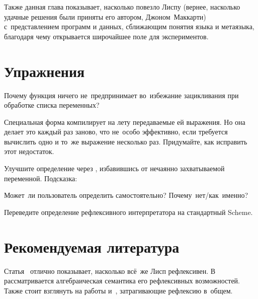 Также данная глава показывает, насколько повезло Лиспу (вернее, насколько
удачные решения были приняты его автором, Джоном~Маккарти) с~представлением
программ и данных, сближающим понятия языка и метаязыка, благодаря чему
открывается широчайшее поле для экспериментов.


\section{Упражнения}\label{reflection/sect:exercises}

\begin{exercise}\label{reflection/ex:no-cycles}
Почему функция  ничего не~предпринимает во~избежание
зацикливания при обработке списка переменных?
\end{exercise}

\begin{exercise}\label{reflection/ex:optimize-ce}
Специальная форма  компилирует на лету передаваемые ей выражения.
Но она делает это каждый раз заново, что не~особо эффективно, если требуется
вычислить одно и то~же выражение несколько раз. Придумайте, как исправить этот
недостаток.
\end{exercise}

\begin{exercise}\label{reflection/ex:no-capture}
Улучшите определение  через , избавившись от нечаянно
захватываемой переменной. Подсказка: 
\end{exercise}

\begin{exercise}\label{reflection/ex:defined}
Может~ли пользователь определить  самостоятельно?
Почему~нет\slash как~именно?
\end{exercise}

\begin{exercise}\label{reflection/ex:rnrs}
Переведите определение рефлексивного интерпретатора на стандартный Scheme.
\end{exercise}


\section*{Рекомендуемая литература}\label{reflection/sect:recommended-reading}

Статья~\cite{dr87} отлично показывает, насколько всё~же Лисп рефлексивен.
В~\cite{mul92} рассматривается алгебраическая семантика его рефлексивных
возможностей. Также стоит взглянуть на работы \cite{jf92} и~\cite{imy92},
затрагивающие рефлексию в~общем.
